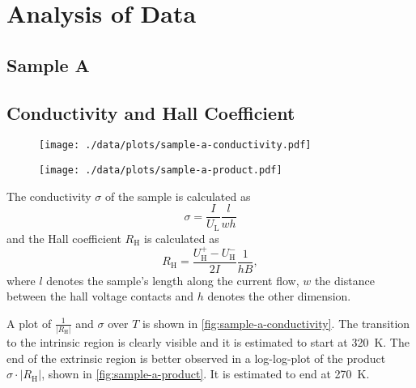 \chapter{Analysis of Data}

\section{Sample A}

\section{Conductivity and Hall Coefficient}
\begin{figure}
  \centering
  \texttt{[image: ./data/plots/sample-a-conductivity.pdf]}
  \label{fig:sample-a-conductivity}
\end{figure}

\begin{figure}
  \centering
  \texttt{[image: ./data/plots/sample-a-product.pdf]}
  \label{fig:sample-a-product}
\end{figure}

The conductivity $\sigma$ of the sample is calculated as
\begin{equation*}
	\sigma = \frac{I}{U_\text{L}} \frac{l}{w h}
\end{equation*}
and the Hall coefficient $R_\text{H}$ is calculated as
\begin{equation*}
	R_\text{H} = \frac{U_\text{H}^+ - U_\text{H}^-}{2 I} \frac{1}{h B},
\end{equation*}
where $l$ denotes the sample's length along the current flow, $w$ the distance between the hall voltage contacts and $h$ denotes the other dimension.

A plot of $\frac{1}{\left|R_\text{H}\right|}$ and $\sigma$ over $T$ is shown in \autoref{fig:sample-a-conductivity}.
The transition to the intrinsic region is clearly visible and it is estimated to start at \SI{320}{\kelvin}.
The end of the extrinsic region is better observed in a log-log-plot of the product $\sigma \cdot \left| R_\text{H} \right|$, shown in \autoref{fig:sample-a-product}.
It is estimated to end at \SI{270}{\kelvin}.


